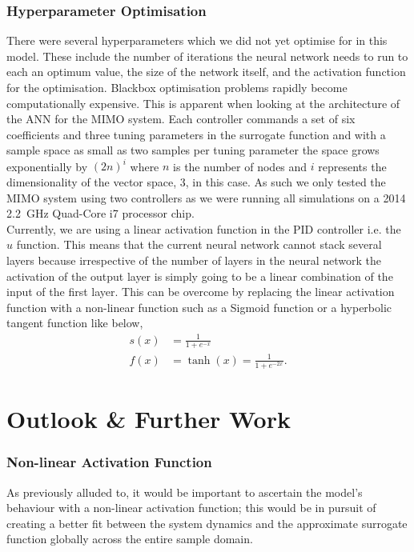 \documentclass[conference]{IEEEtran}
\theoremstyle{definition}
\begin{document}
\subsubsection{Hyperparameter Optimisation}
There were several hyperparameters which we did not yet optimise for in this model. These include the number of iterations the neural network needs to run to each an optimum value, the size of the network itself, and the activation function for the optimisation. Blackbox optimisation problems rapidly become computationally expensive. This is apparent when looking at the architecture of the ANN for the MIMO system. Each controller commands a set of six coefficients and three tuning parameters in the surrogate function and with a sample space as small as two samples per tuning parameter the space grows exponentially by $(2n)^i$ where $n$ is the number of nodes and $i$ represents the dimensionality of the vector space, 3, in this case. As such we only tested the MIMO system using two controllers as we were running all simulations on a 2014 \SI{2.2}{GHz} Quad-Core i7 processor chip. \\
Currently, we are using a linear activation function in the PID controller i.e. the $u$ function. This means that the current neural network cannot stack several layers because irrespective of the number of layers in the neural network the activation of the output layer is simply going to be a linear combination of the input of the first layer. This can be overcome by replacing the linear activation function with a non-linear function such as a Sigmoid function or a hyperbolic tangent function like below, 
\begin{align}
    s(x) &= \frac{1}{1 + e^{-x}} \\
    f(x) &= \tanh(x) = \frac{1}{1+e^{-2x}}.
    \end{align}
\vspace{3mm}

\section{Outlook \& Further Work}
\subsubsection{Non-linear Activation Function}
As previously alluded to, it would be important to ascertain the model's behaviour with a non-linear activation function; this would be in pursuit of creating a better fit between the system dynamics and the approximate surrogate function globally across the entire sample domain.
\vspace{2mm}
\end{document}
